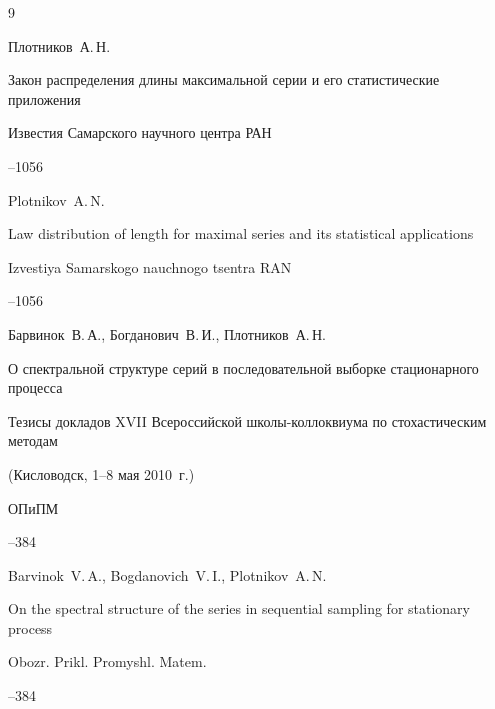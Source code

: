 \begin{thebibliography}{9}

\by Плотников~А.\,Н.

\paper Закон распределения длины максимальной серии и его статистические приложения 

\jour Известия Самарского научного центра РАН




--1056

\misctransl

\by Plotnikov~A.\,N.

\paper Law distribution of  length for  maximal series and its statistical applications

\jour Izvestiya Samarskogo nauchnogo tsentra RAN 




--1056






\by Барвинок~В.\,А., Богданович~В.\,И., Плотников~А.\,Н.

\paper О спектральной структуре серий в последовательной выборке стационарного процесса

\paperinfo Тезисы докладов XVII Всероссийской школы-коллоквиума по стохастическим методам


(Кисловодск, 1--8 мая 2010~г.)

\jour ОПиПМ




--384

\misctransl

\by Barvinok~V.\,A., Bogdanovich~V.\,I., Plotnikov~A.\,N.

\paper On the spectral structure of the series in   sequential sampling for stationary process

\jour Obozr. Prikl. Promyshl. Matem.




--384



\end{thebibliography}







\noindent

\hskip6.5cm \thedate \par\noindent

\hskip6.5cm\therevdate







\makeengtitlem







 \newpage

%


%

%

